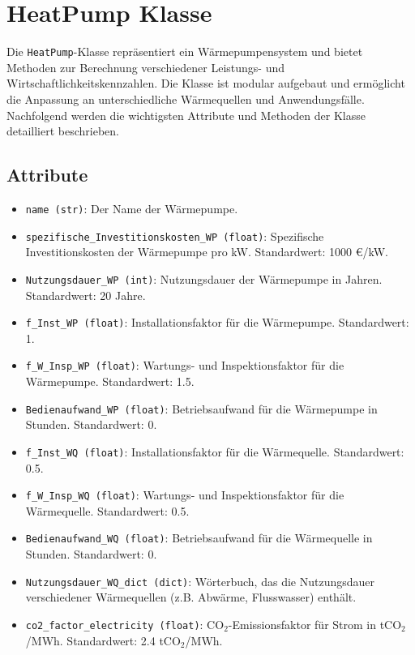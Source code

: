 \section{HeatPump Klasse}
Die \texttt{HeatPump}-Klasse repräsentiert ein Wärmepumpensystem und bietet Methoden zur Berechnung verschiedener Leistungs- und Wirtschaftlichkeitskennzahlen. Die Klasse ist modular aufgebaut und ermöglicht die Anpassung an unterschiedliche Wärmequellen und Anwendungsfälle. Nachfolgend werden die wichtigsten Attribute und Methoden der Klasse detailliert beschrieben.

\subsection{Attribute}
\begin{itemize}
    \item \texttt{name (str)}: Der Name der Wärmepumpe.
    \item \texttt{spezifische\_Investitionskosten\_WP (float)}: Spezifische Investitionskosten der Wärmepumpe pro kW. Standardwert: 1000 €/kW.
    \item \texttt{Nutzungsdauer\_WP (int)}: Nutzungsdauer der Wärmepumpe in Jahren. Standardwert: 20 Jahre.
    \item \texttt{f\_Inst\_WP (float)}: Installationsfaktor für die Wärmepumpe. Standardwert: 1.
    \item \texttt{f\_W\_Insp\_WP (float)}: Wartungs- und Inspektionsfaktor für die Wärmepumpe. Standardwert: 1.5.
    \item \texttt{Bedienaufwand\_WP (float)}: Betriebsaufwand für die Wärmepumpe in Stunden. Standardwert: 0.
    \item \texttt{f\_Inst\_WQ (float)}: Installationsfaktor für die Wärmequelle. Standardwert: 0.5.
    \item \texttt{f\_W\_Insp\_WQ (float)}: Wartungs- und Inspektionsfaktor für die Wärmequelle. Standardwert: 0.5.
    \item \texttt{Bedienaufwand\_WQ (float)}: Betriebsaufwand für die Wärmequelle in Stunden. Standardwert: 0.
    \item \texttt{Nutzungsdauer\_WQ\_dict (dict)}: Wörterbuch, das die Nutzungsdauer verschiedener Wärmequellen (z.B. Abwärme, Flusswasser) enthält.
    \item \texttt{co2\_factor\_electricity (float)}: CO$_2$-Emissionsfaktor für Strom in tCO$_2$/MWh. Standardwert: 2.4 tCO$_2$/MWh.
\end{itemize}

